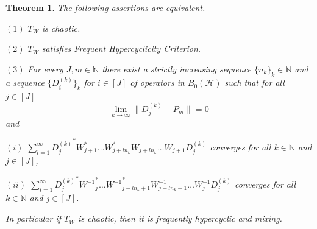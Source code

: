 \documentclass{article}
\newtheorem{theorem}{Theorem}[section]
\begin{document}
\begin{theorem}\label{th2.4}
The following assertions are equivalent.

$(1)$ $T_{W}$ is chaotic.

$(2)$ $T_{W}$ satisfies Frequent Hypercyclicity Criterion.

$(3)$ For every $J,m\in\mathbb{N}$ there exist a strictly increasing sequence $\{n_{k}\}_{k}\in \mathbb{N}$ and a sequence $\{D^{(k)}_{i}\}_{k}$ for $i\in [J]$ of operators in $B_{0}(\mathcal{H})$ such that for all $j\in[J]$
\[\lim_{k\rightarrow\infty}\|D^{(k)}_{j}-P_{m}\|=0\]
and

$(i)$ $\sum^{\infty}_{l=1}{D^{(k)}_{j}}^{\ast}{W^{\ast}_{j+1}}\ldots {W^{\ast}_{j+ln_{k}}}W_{j+ln_{k}}\ldots W_{j+1}D^{(k)}_{j}$ converges for all $k\in \mathbb{N}$ and $j\in[J]$,

$(ii)$ $\sum^{\infty}_{l=1}{D^{(k)}_{j}}^{\ast}{{W^{-1}}^{\ast}_{j}}\ldots {{W^{-1}}^{\ast}_{j-ln_{k}+1}}W^{-1}_{j-ln_{k}+1}\ldots W^{-1}_{j}D^{(k)}_{j}$ converges for all $k\in \mathbb{N}$ and $j\in[J]$.

In particular if $T_{W}$ is chaotic, then it is frequently hypercyclic and mixing.
\end{theorem}
\end{document}
